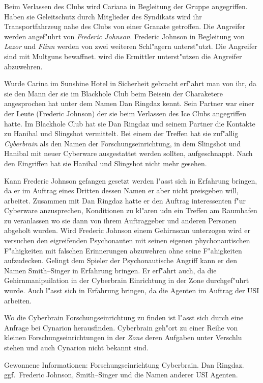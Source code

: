 Beim Verlassen des Clubs wird Cariana in Begleitung der Gruppe angegriffen. Haben sie Geleitschutz durch Mitglieder des Syndikats wird ihr Transportfahrzeug nahe des Clubs von einer Granate getroffen. Die Angreifer werden angef"uhrt von \emph{Frederic Johnson}. Frederic Johnson in Begleitung von \emph{Lazor} und \emph{Flinn} werden von zwei weiteren Schl"agern unterst"utzt. Die Angreifer sind mit Multguns bewaffnet. \xl{} wird die Ermittler unterst"utzen die Angreifer abzuwehren.

Wurde Carina im Sunshine Hotel in Sicherheit gebracht erf"ahrt man von ihr, da\3 sie den Mann der sie im Blackhole Club beim Beisein der Charaketere angesprochen hat unter dem Namen Dan Ringdaz kennt. Sein Partner war einer der Leute (Frederic Johnson) der sie beim Verlassen des Ice Clubs angegriffen hatte. Im Blackhole Club hat sie Dan Ringdaz und seinem Partner die Kontakte zu Hanibal und Slingshot vermittelt. Bei einem der Treffen hat sie zuf"allig \emph{Cyberbrain} als den Namen der Forschungseinrichtung, in dem Slingshot und Hanibal mit neuer Cyberware ausgestattet werden sollten, aufgeschnappt. Nach den Eingriffen hat sie Hanibal und Slingshot nicht mehr gesehen.

Kann Frederic Johnson gefangen gesetzt werden l"asst sich in Erfahrung bringen, da\3 er im Auftrag eines Dritten dessen Namen er aber nicht preisgeben will, arbeitet. Zusammen mit Dan Ringdaz hatte er den Auftrag interessenten f"ur Cyberware anzusprechen, Konditionen zu kl"aren udn ein Treffen am Raumhafen zu veranlassen wo sie dann von ihrem Auftraggeber und anderen Personen abgeholt wurden. Wird Frederic Johnson einem Gehirnscan unterzogen wird er versuchen den eigreifenden Psychonauten mit seinen eigenen phychonautischen F"ahigkeiten mit falschen Erinnerungen abzuwehren ohne seine F"ahigkeiten aufzudecken. Gelingt dem Spieler der Psychonautische Angriff kann er den Namen Smith--Singer in Erfahrung bringen. Er erf"ahrt auch, da\3 die Gehirnmanipuilation in der Cyberbrain Einrichtung in der Zone durchgef"uhrt wurde. Auch l"asst sich in Erfahrung bringen, da\3 die Agenten im Auftrag der USI arbeiten.

Wo die Cyberbrain Forschungseinrichtung zu finden ist l"asst sich durch eine Anfrage bei Cynarion herausfinden. Cyberbrain geh"ort zu einer Reihe von kleinen Forschungseinrichtungen in der \emph{Zone} deren Aufgaben unter Verschlu\3 stehen und auch Cynarion nicht bekannt sind.

\begin{remarks}
	Gewonnene Informationen: Forschungseinrichtung Cyberbrain. Dan Ringdaz. ggf.~Frederic Johnson, Smith--Singer und die Namen anderer USI Agenten.
\end{remarks}

